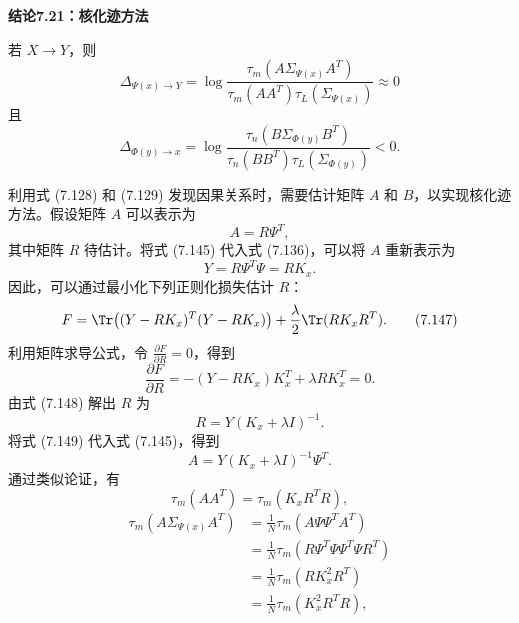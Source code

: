 \par\medskip{}\noindent\textbf{结论7.21：核化迹方法}\label{ch07a-result-kernel}\par
若 $X\to Y$，则
\begin{equation}
\Delta_{\Psi(x)\to Y}=\log\frac{\tau_m(A\Sigma_{\Psi(x)}A^T)}{\tau_m(AA^T)\tau_L(\Sigma_{\Psi(x)})}\approx0
\tag{7.143}
\end{equation}
且
\begin{equation}
\Delta_{\Phi(y)\to x}=\log\frac{\tau_n(B\Sigma_{\Phi(y)}B^T)}{\tau_n(BB^T)\tau_L(\Sigma_{\Phi(y)})}<0.
\tag{7.144}
\end{equation}

利用式 (7.128) 和 (7.129) 发现因果关系时，需要估计矩阵 $A$ 和 $B$，以实现核化迹方法。假设矩阵 $A$ 可以表示为
\begin{equation}
A=R\Psi^T,
\tag{7.145}
\end{equation}
其中矩阵 $R$ 待估计。将式 (7.145) 代入式 (7.136)，可以将 $A$ 重新表示为
\begin{equation}
Y=R\Psi^T\Psi=RK_x.
\tag{7.146}
\end{equation}
因此，可以通过最小化下列正则化损失估计 $R$：
\begin{equation}
F=\Tr\bigl((Y-RK_x)^T(Y-RK_x)\bigr)+\frac\lambda2\Tr(RK_xR^T).
\tag{7.147}
\end{equation}
利用矩阵求导公式，令 $\frac{\partial F}{\partial R}=0$，得到
\begin{equation}
\frac{\partial F}{\partial R}=-(Y-RK_x)K_x^T+\lambda RK_x^T=0.
\tag{7.148}
\end{equation}
由式 (7.148) 解出 $R$ 为
\begin{equation}
R=Y(K_x+\lambda I)^{-1}.
\tag{7.149}
\end{equation}
将式 (7.149) 代入式 (7.145)，得到
\begin{equation}
A=Y(K_x+\lambda I)^{-1}\Psi^T.
\tag{7.150}
\end{equation}
通过类似论证，有
\begin{equation}
\tau_m(AA^T)=\tau_m(K_xR^TR),
\tag{7.151}
\end{equation}
\begin{equation}
\begin{aligned}
\tau_m(A\Sigma_{\Psi(x)}A^T)&=\frac1N\tau_m(A\Psi\Psi^TA^T)\\
&=\frac1N\tau_m(R\Psi^T\Psi\Psi^T\Psi R^T)\\
&=\frac1N\tau_m(RK_x^2R^T)\\
&=\frac1N\tau_m(K_x^2R^TR),
\end{aligned}
\tag{7.152}
\end{equation}
